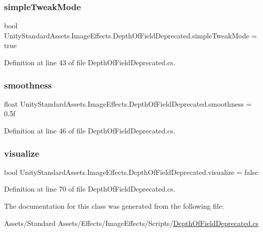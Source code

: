 \subsubsection{\texorpdfstring{simple\+Tweak\+Mode}{simpleTweakMode}}
{\footnotesize\ttfamily bool Unity\+Standard\+Assets.\+Image\+Effects.\+Depth\+Of\+Field\+Deprecated.\+simple\+Tweak\+Mode = true}



Definition at line 43 of file Depth\+Of\+Field\+Deprecated.\+cs.

\mbox{\label{class_unity_standard_assets_1_1_image_effects_1_1_depth_of_field_deprecated_a9fdc06de652648e0ccfba3b74eb24e33}} 
\subsubsection{\texorpdfstring{smoothness}{smoothness}}
{\footnotesize\ttfamily float Unity\+Standard\+Assets.\+Image\+Effects.\+Depth\+Of\+Field\+Deprecated.\+smoothness = 0.\+5f}



Definition at line 46 of file Depth\+Of\+Field\+Deprecated.\+cs.

\mbox{\label{class_unity_standard_assets_1_1_image_effects_1_1_depth_of_field_deprecated_a9a6faaa58543959a9ad7ced4e6dd48e9}} 
\subsubsection{\texorpdfstring{visualize}{visualize}}
{\footnotesize\ttfamily bool Unity\+Standard\+Assets.\+Image\+Effects.\+Depth\+Of\+Field\+Deprecated.\+visualize = false}



Definition at line 70 of file Depth\+Of\+Field\+Deprecated.\+cs.



The documentation for this class was generated from the following file\+:\begin{DoxyCompactItemize}
\item 
Assets/\+Standard Assets/\+Effects/\+Image\+Effects/\+Scripts/\mbox{\hyperlink{_depth_of_field_deprecated_8cs}{Depth\+Of\+Field\+Deprecated.\+cs}}\end{DoxyCompactItemize}
